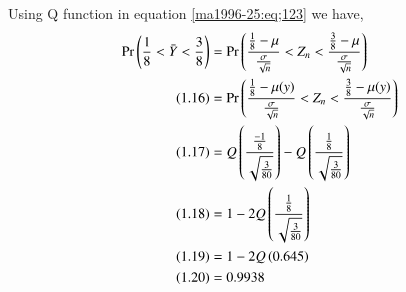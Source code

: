 Using Q function in equation \ref{ma1996-25:eq;123} we have,
\begin{align}
\notag
\Pr\left(\frac{1}{8}<\Bar{Y}<\frac{3}{8}\right)
&=\Pr\left(\frac{\frac{1}{8}-\mu}{\frac{\sigma}{\sqrt{n}}}<Z_{n}<\frac{\frac{3}{8}-\mu}{\frac{\sigma}{\sqrt{n}}}\right)\\
\tag{1.16}
&=\Pr\left(\frac{\frac{1}{8}-\mu(y)}{\frac{\sigma}{\sqrt{n}}}<Z_{n}<\frac{\frac{3}{8}-\mu(y)}{\frac{\sigma}{\sqrt{n}}}\right)\\
\tag{1.17}
&=Q\left(\frac{\frac{-1}{8}}{\sqrt{\frac{3}{80}}}\right)-Q\left(\frac{\frac{1}{8}}{\sqrt{\frac{3}{80}}}\right)\\
\tag{1.18}
&=1-2Q\left(\frac{\frac{1}{8}}{\sqrt{\frac{3}{80}}}\right)\\
\tag{1.19}                             
&=1-2Q\left(0.645\right)\\
\tag{1.20}                             
&=0.9938
\end{align}